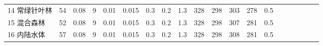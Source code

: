 \begin{sidewaystable}[]
\begin{tabular}{@{}lccccccccccccccccccc@{}}
    14 常绿针叶林   & 54                                                                & 0.08                                                                                                   & 9                                                                                  & 0.01                                                                               & 0.015                                                               & 0.3                                                       & 0.2                                                       & 1.3                                                       & 328                                                             & 298                                                             & 303                                                              & 278                                                               & 0.5                                                          \\
    15 混合森林    & 52                                                                & 0.08                                                                                                   & 9                                                                                  & 0.01                                                                               & 0.015                                                               & 0.3                                                       & 0.2                                                       & 1.3                                                       & 328                                                             & 298                                                             & 307                                                              & 281                                                               & 0.5                                                          \\
    16 内陆水体    & 57                                                                & 0.08                                                                                                   & 9                                                                                  & 0.01                                                                               & 0.015                                                               & 0.3                                                       & 0.2                                                       & 1.3                                                       & 328                                                             & 298                                                             & 308                                                              & 281                                                               & 0.5                                                          \\

\end{tabular}
\end{sidewaystable}
